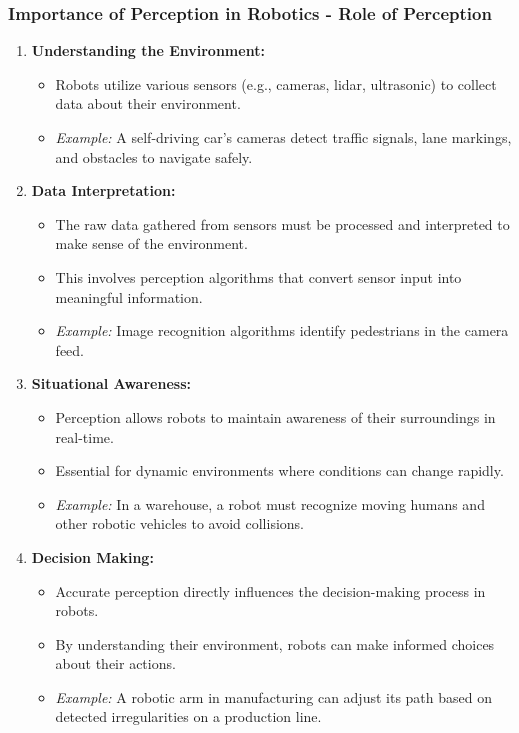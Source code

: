 \documentclass{beamer}
\begin{document}
\begin{frame}[fragile]
    \frametitle{Importance of Perception in Robotics - Role of Perception}
    \begin{enumerate}
        \item \textbf{Understanding the Environment:}
            \begin{itemize}
                \item Robots utilize various sensors (e.g., cameras, lidar, ultrasonic) to collect data about their environment.
                \item \textit{Example:} A self-driving car’s cameras detect traffic signals, lane markings, and obstacles to navigate safely.
            \end{itemize}
      
        \item \textbf{Data Interpretation:}
            \begin{itemize}
                \item The raw data gathered from sensors must be processed and interpreted to make sense of the environment.
                \item This involves perception algorithms that convert sensor input into meaningful information.
                \item \textit{Example:} Image recognition algorithms identify pedestrians in the camera feed.
            \end{itemize}
      
        \item \textbf{Situational Awareness:}
            \begin{itemize}
                \item Perception allows robots to maintain awareness of their surroundings in real-time.
                \item Essential for dynamic environments where conditions can change rapidly.
                \item \textit{Example:} In a warehouse, a robot must recognize moving humans and other robotic vehicles to avoid collisions.
            \end{itemize}
      
        \item \textbf{Decision Making:}
            \begin{itemize}
                \item Accurate perception directly influences the decision-making process in robots.
                \item By understanding their environment, robots can make informed choices about their actions.
                \item \textit{Example:} A robotic arm in manufacturing can adjust its path based on detected irregularities on a production line.
            \end{itemize}
    \end{enumerate}
\end{frame}
\end{document}
